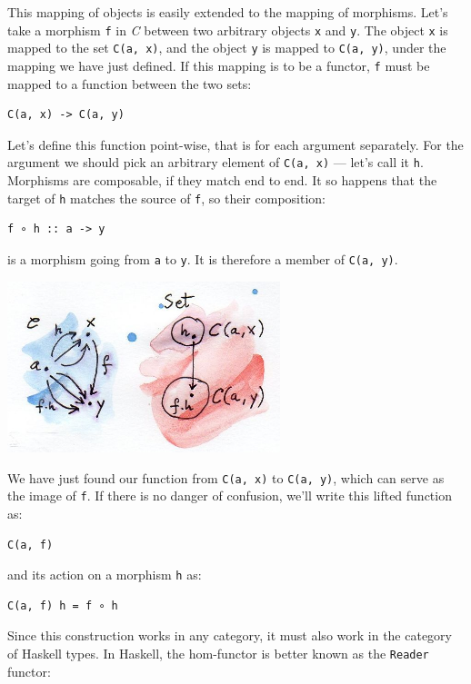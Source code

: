 This mapping of objects is easily extended to the mapping of morphisms.
Let's take a morphism \texttt{f} in \emph{C} between two arbitrary
objects \texttt{x} and \texttt{y}. The object \texttt{x} is mapped to
the set \texttt{C(a,\ x)}, and the object \texttt{y} is mapped to
\texttt{C(a,\ y)}, under the mapping we have just defined. If this
mapping is to be a functor, \texttt{f} must be mapped to a function
between the two sets:

\begin{verbatim}
C(a, x) -> C(a, y)
\end{verbatim}

Let's define this function point-wise, that is for each argument
separately. For the argument we should pick an arbitrary element of
\texttt{C(a,\ x)} --- let's call it \texttt{h}. Morphisms are
composable, if they match end to end. It so happens that the target of
\texttt{h} matches the source of \texttt{f}, so their composition:

\begin{verbatim}
f ∘ h :: a -> y
\end{verbatim}

is a morphism going from \texttt{a} to \texttt{y}. It is therefore a
member of \texttt{C(a,\ y)}.

\includegraphics[width=3.12500in]{images/hom-functor.jpg}

We have just found our function from \texttt{C(a,\ x)} to
\texttt{C(a,\ y)}, which can serve as the image of \texttt{f}. If there
is no danger of confusion, we'll write this lifted function as:

\begin{verbatim}
C(a, f)
\end{verbatim}

and its action on a morphism \texttt{h} as:

\begin{verbatim}
C(a, f) h = f ∘ h
\end{verbatim}

Since this construction works in any category, it must also work in the
category of Haskell types. In Haskell, the hom-functor is better known
as the \texttt{Reader} functor:

